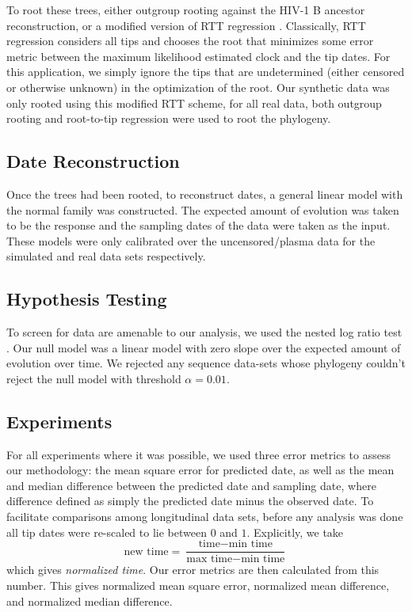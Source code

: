 To root these trees, either outgroup rooting against the HIV-1 B ancestor reconstruction, or a modified version of RTT regression \citep{APE}. 
Classically, RTT regression considers all tips and chooses the root that minimizes some error metric between the maximum likelihood estimated clock and the tip dates. 
For this application, we simply ignore the tips that are undetermined (either censored or otherwise unknown) in the optimization of the root. 
Our synthetic data was only rooted using this modified RTT scheme, for all real data, both outgroup rooting and root-to-tip regression were used to root the phylogeny. 


\subsection{Date Reconstruction} \label{subsec:daterecon}
Once the trees had been rooted, to reconstruct dates, a general linear model with the normal family was constructed. 
The expected amount of evolution was taken to be the response and the sampling dates of the data were taken as the input. 
These models were only calibrated over the uncensored/plasma data for the simulated and real data sets respectively.

\subsection{Hypothesis Testing} \label{subsec:hypot}
To screen for data are amenable to our analysis, we used the nested log ratio test \citep{Ho14}. 
Our null model was a linear model with zero slope over the expected amount of evolution over time. 
We rejected any sequence data-sets whose phylogeny couldn't reject the null model with threshold $\alpha=0.01$.


\subsection{Experiments} \label{subsec:experiments}
For all experiments where it was possible, we used three error metrics to assess  our methodology: the mean square error for predicted date, as well as the mean and median difference between the predicted date and sampling date, where difference defined as simply the predicted date minus the observed date.
To facilitate comparisons among longitudinal data sets, before any analysis was done all tip dates were re-scaled to lie between $0$ and $1$. 
Explicitly, we take $$ \text{new time} = \frac{\text{time} - \text{min time}}{\text{max time} - \text{min time}}$$ which gives {\em normalized time}. Our error metrics are then calculated from this number. This gives normalized mean square error, normalized mean difference, and normalized median difference. 

